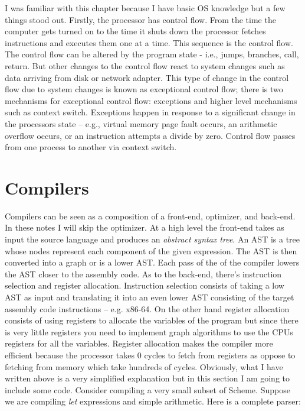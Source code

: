 \documentclass{amsbook}
\begin{document}
I was familiar with this chapter because I have basic OS knowledge but a few things stood out. Firstly, the processor has control flow. From the time the computer gets turned on to the time it shuts down the processor fetches instructions and executes them one at a time. This sequence is the control flow. The control flow can be altered by the program state - i.e., jumps, branches, call, return. But other changes to the control flow react to system changes such as data arriving from disk or network adapter. This type of change in the control flow due to system changes is known as exceptional control flow; there is two mechanisms for exceptional control flow: exceptions and higher level mechanisms such as context switch. Exceptions happen in response to a significant change in the processors  state -- e.g., virtual memory page fault occurs, an arithmetic overflow occurs, or an instruction attempts a divide by zero. Control flow passes from one process to another via context switch.

\chapter{Compilers}

Compilers can be seen as a composition of a front-end, optimizer, and back-end. In these notes I will skip the optimizer. At a high level the front-end takes as input the source language and produces an \textit{abstract syntax tree}. An AST is a tree whose nodes represent each component of the given expression. The AST is then converted into a graph or is a lower AST. Each pass of the of the compiler lowers the AST closer to the assembly code. As to the back-end, there's instruction selection and register allocation. Instruction selection consists of taking a low AST as input and translating it into an even lower AST consisting of the target assembly code instructions -- e.g. x86-64. On the other hand register allocation consists of using registers to allocate the variables of the program but since there is very little registers you need to implement graph algorithms to use the CPUs registers for all the variables. Register allocation makes the compiler more efficient because the processor takes 0 cycles to fetch from registers as oppose to fetching from memory which take hundreds of cycles. Obviously, what I have written above is a very simplified explanation but in this section I am going to include some code. Consider compiling a very small subset of Scheme. Suppose we are compiling \textit{let} expressions and simple arithmetic. Here is a complete parser:
\end{document}
